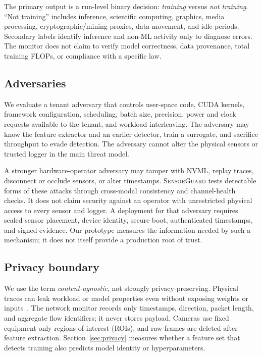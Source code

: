 \documentclass[sigplan,anonymous,review,nonacm]{acmart}
\newcommand{\system}{\textsc{SensorGuard}}
\begin{document}
The primary output is a run-level binary decision: \emph{training} versus \emph{not training}. ``Not training'' includes inference, scientific computing, graphics, media processing, cryptographic/mining proxies, data movement, and idle periods. Secondary labels identify inference and non-ML activity only to diagnose errors. The monitor does not claim to verify model correctness, data provenance, total training FLOPs, or compliance with a specific law.

\subsection{Adversaries}

We evaluate a tenant adversary that controls user-space code, CUDA kernels, framework configuration, scheduling, batch size, precision, power and clock requests available to the tenant, and workload interleaving. The adversary may know the feature extractor and an earlier detector, train a surrogate, and sacrifice throughput to evade detection. The adversary cannot alter the physical sensors or trusted logger in the main threat model.

A stronger hardware-operator adversary may tamper with NVML, replay traces, disconnect or occlude sensors, or alter timestamps. \system{} tests detectable forms of these attacks through cross-modal consistency and channel-health checks. It does not claim security against an operator with unrestricted physical access to every sensor and logger. A deployment for that adversary requires sealed sensor placement, device identity, secure boot, authenticated timestamps, and signed evidence. Our prototype measures the information needed by such a mechanism; it does not itself provide a production root of trust.

\subsection{Privacy boundary}

We use the term \emph{content-agnostic}, not strongly privacy-preserving. Physical traces can leak workload or model properties even without exposing weights or inputs~\cite{maia2022magnetic,arefin2025ports}. The network monitor records only timestamps, direction, packet length, and aggregate flow identifiers; it never stores payload. Cameras use fixed equipment-only regions of interest (ROIs), and raw frames are deleted after feature extraction. Section~\ref{sec:privacy} measures whether a feature set that detects training also predicts model identity or hyperparameters.
\end{document}
